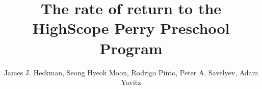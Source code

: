 
\title{The rate of return to the HighScope Perry Preschool Program}
\author{James J. Heckman, Seong Hyeok Moon, Rodrigo Pinto, Peter A. Savelyev, Adam Yavitz}

\date{}

\let\otp\titlepage
